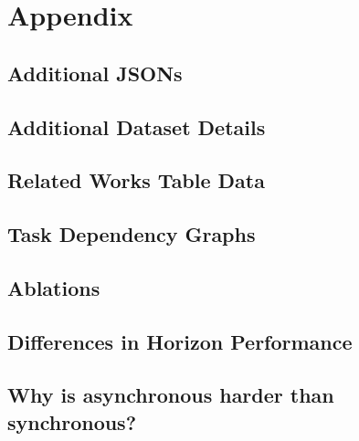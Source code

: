 \appendix

\section{Appendix}



\subsection{Additional \robotouille{} JSONs}
\label{app:additional-jsons}


% 

\subsection{Additional Dataset Details}
\label{app:dataset-extra}


\subsection{Related Works Table Data}
\label{app:related-works-details}


\subsection{Task Dependency Graphs}
\label{app:dependency-graphs}


\subsection{\react{} Ablations}
\label{app:react-ablations}


\subsection{Differences in Horizon Performance}
\label{app:horizon_complexity}


\subsection{Why is asynchronous harder than synchronous?}
\label{app:async-harder-sync}


